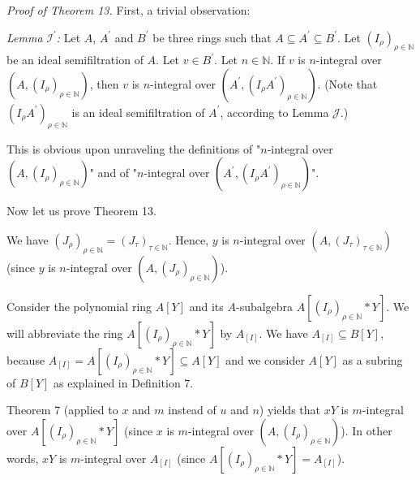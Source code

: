 \documentclass[12pt,final,notitlepage,onecolumn]{article}%
\begin{document}
\textit{Proof of Theorem 13.} First, a trivial observation:

\textit{Lemma }$\mathcal{I}^{\prime}$\textit{:} Let $A$, $A^{\prime}$ and
$B^{\prime}$ be three rings such that $A\subseteq A^{\prime}\subseteq
B^{\prime}$. Let $\left(  I_{\rho}\right)  _{\rho\in\mathbb{N}}$ be an ideal
semifiltration of $A$. Let $v\in B^{\prime}$. Let $n\in\mathbb{N}$. If $v$ is
$n$-integral over $\left(  A,\left(  I_{\rho}\right)  _{\rho\in\mathbb{N}%
}\right)  $, then $v$ is $n$-integral over $\left(  A^{\prime},\left(
I_{\rho}A^{\prime}\right)  _{\rho\in\mathbb{N}}\right)  $. (Note that $\left(
I_{\rho}A^{\prime}\right)  _{\rho\in\mathbb{N}}$ is an ideal semifiltration of
$A^{\prime}$, according to Lemma $\mathcal{J}$.)

This is obvious upon unraveling the definitions of "$n$-integral over $\left(
A,\left(  I_{\rho}\right)  _{\rho\in\mathbb{N}}\right)  $" and of
"$n$-integral over $\left(  A^{\prime},\left(  I_{\rho}A^{\prime}\right)
_{\rho\in\mathbb{N}}\right)  $".

Now let us prove Theorem 13.

We have $\left(  J_{\rho}\right)  _{\rho\in\mathbb{N}}=\left(  J_{\tau
}\right)  _{\tau\in\mathbb{N}}$. Hence, $y$ is $n$-integral over $\left(
A,\left(  J_{\tau}\right)  _{\tau\in\mathbb{N}}\right)  $ (since $y$ is
$n$-integral over $\left(  A,\left(  J_{\rho}\right)  _{\rho\in\mathbb{N}%
}\right)  $).

Consider the polynomial ring $A\left[  Y\right]  $ and its $A$-subalgebra
$A\left[  \left(  I_{\rho}\right)  _{\rho\in\mathbb{N}}\ast Y\right]  $. We
will abbreviate the ring $A\left[  \left(  I_{\rho}\right)  _{\rho
\in\mathbb{N}}\ast Y\right]  $ by $A_{\left[  I\right]  }$. We have
$A_{\left[  I\right]  }\subseteq B\left[  Y\right]  $, because $A_{\left[
I\right]  }=A\left[  \left(  I_{\rho}\right)  _{\rho\in\mathbb{N}}\ast
Y\right]  \subseteq A\left[  Y\right]  $ and we consider $A\left[  Y\right]  $
as a subring of $B\left[  Y\right]  $ as explained in Definition 7.

Theorem 7 (applied to $x$ and $m$ instead of $u$ and $n$) yields that $xY$ is
$m$-integral over $A\left[  \left(  I_{\rho}\right)  _{\rho\in\mathbb{N}}\ast
Y\right]  $ (since $x$ is $m$-integral over $\left(  A,\left(  I_{\rho
}\right)  _{\rho\in\mathbb{N}}\right)  $). In other words, $xY$ is
$m$-integral over $A_{\left[  I\right]  }$ (since $A\left[  \left(  I_{\rho
}\right)  _{\rho\in\mathbb{N}}\ast Y\right]  =A_{\left[  I\right]  }$).
\end{document}
